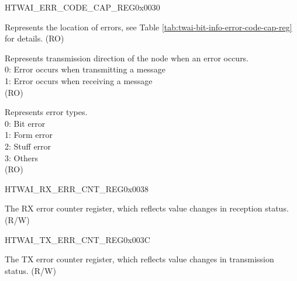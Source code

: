 \begin{register}{H}{TWAI\_ERR\_CODE\_CAP\_REG}{0x0030}\label{regdesc:TWAIERRCODECAPREG}
%
%
%
%
\regnewline%
\begin{regdesc}\begin{reglist}
\label{fielddesc:TWAIERRCAPTURECODESEGMENT}\item [TWAI\_ERR\_CAPTURE\_CODE\_SEGMENT] Represents the location of errors, see Table \ref{tab:twai-bit-info-error-code-cap-reg} for details. (RO)
\label{fielddesc:TWAIERRCAPTURECODEDIRECTION}\item [TWAI\_ERR\_CAPTURE\_CODE\_DIRECTION] Represents transmission direction of the node when an error occurs.\\
0: Error occurs when transmitting a message\\
1: Error occurs when receiving a message \\
(RO)
\label{fielddesc:TWAIERRCAPTURECODETYPE}\item [TWAI\_ERR\_CAPTURE\_CODE\_TYPE] Represents error types.\\
0: Bit error\\
1: Form error\\
2: Stuff error\\
3: Others \\
(RO)
\end{reglist}\end{regdesc}
\end{register}


\begin{register}{H}{TWAI\_RX\_ERR\_CNT\_REG}{0x0038}\label{regdesc:TWAIRXERRCNTREG}
%
%
\regnewline%
\begin{regdesc}\begin{reglist}
\label{fielddesc:TWAIRXERRCNT}\item [TWAI\_RX\_ERR\_CNT] The RX error counter register, which reflects value changes in reception status. (R/W)
\end{reglist}\end{regdesc}
\end{register}


\begin{register}{H}{TWAI\_TX\_ERR\_CNT\_REG}{0x003C}\label{regdesc:TWAITXERRCNTREG}
%
%
\regnewline%
\begin{regdesc}\begin{reglist}
\label{fielddesc:TWAITXERRCNT}\item [TWAI\_TX\_ERR\_CNT] The TX error counter register, which reflects value changes in transmission status. (R/W)
\end{reglist}\end{regdesc}
\end{register}


